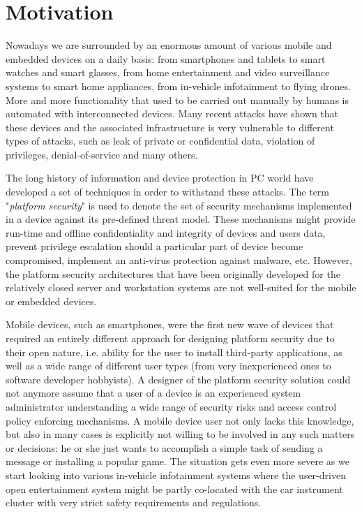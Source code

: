 
\section{Motivation}

Nowadays we are surrounded by an enormous amount of various mobile and embedded devices on a daily basis: from smartphones and tablets to smart watches and smart glasses, from home entertainment and video surveillance systems to smart home appliances, from in-vehicle infotainment to flying drones. More and more functionality that used to be carried out manually by humans is automated with interconnected devices. Many recent attacks have shown that these devices and the associated infrastructure is very vulnerable to different types of attacks, such as leak of private or confidential data, violation of privileges, denial-of-service and many others. 

The long history of information and device protection in PC world have developed a set of techniques in order to withstand these attacks. The term "\textit{platform security}" is used to denote the set of security mechanisms implemented in a device against its pre-defined threat model. These mechanisms might provide run-time and offline confidentiality and integrity of devices and users data, prevent privilege escalation should a particular part of device become compromised, implement an anti-virus protection against malware, etc. However, the platform security architectures that have been originally developed for the relatively closed server and workstation systems are not well-suited for the mobile or embedded devices. 

Mobile devices, such as smartphones, were the first new wave of devices that required an entirely different approach for designing platform security due to their open nature, i.e. ability for the user to install third-party applications, as well as a wide range of different user types (from very inexperienced ones to software developer hobbyists). A designer of the platform security solution could not anymore assume that a user of a device is an experienced system administrator understanding a wide range of security risks and access control policy enforcing mechanisms. A mobile device user not only lacks this knowledge, but also in many cases is explicitly not willing to be involved in any such matters or decisions: he or she just wants to accomplish a simple task of sending a message or installing a popular game. The situation gets even more severe as we start looking into various in-vehicle infotainment systems where the user-driven open entertainment system might be partly co-located with the car instrument cluster with very strict safety requirements and regulations. 


